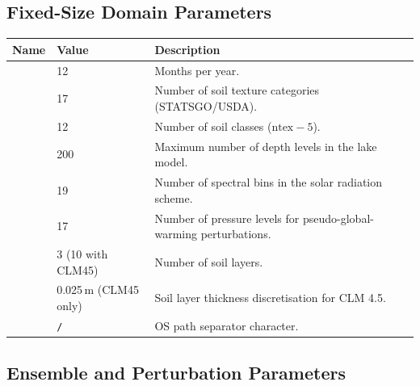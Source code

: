 \subsection{Fixed-Size Domain Parameters}
\label{subsec:dynparam_fixed}

\begin{longtable}{L{4cm} L{3cm} L{7cm}}
  \toprule
  \textbf{Name} & \textbf{Value} & \textbf{Description} \\
  \midrule
  \endhead
  \bottomrule
  \endfoot
         & 12  & Months per year. \\
        & 17  & Number of soil texture categories (STATSGO/USDA). \\
        & 12  & Number of soil classes ($\text{ntex}-5$). \\
      & 200 & Maximum number of depth levels in the lake model. \\
        & 19  & Number of spectral bins in the solar radiation scheme. \\
     & 17  & Number of pressure levels for pseudo-global-warming
    perturbations. \\
   & 3 (10 with CLM45) &
    Number of soil layers. \\
      & 0.025\,m (CLM45 only) &
    Soil layer thickness discretisation for CLM 4.5. \\
      & \texttt{/} & OS path separator character. \\
\end{longtable}

\subsection{Ensemble and Perturbation Parameters}
\label{subsec:dynparam_ensemble}

